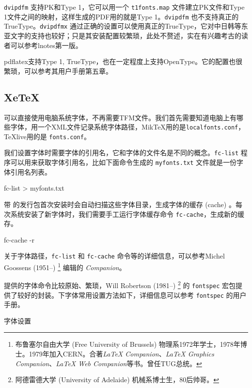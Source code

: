 \texttt{dvipdfm} 支持PK和Type 1，它可以用一个 \texttt{t1fonts.map} 文件建立PK文件和Type 1文件之间的映射，这样生成的PDF用的就是Type 1。\texttt{dvipdfm} 也不支持真正的TrueType。\texttt{dvipdfmx} 通过正确的设置可以使用真正的TrueType，它对中日韩等东亚文字的支持也较好；只是其安装配置较繁琐，此处不赘述，实在有兴趣考古的读者可以参考lnotes第一版\citep{Huang_2008}。

pdflatex支持Type 1, TrueType，也在一定程度上支持OpenType。它的配置也很繁琐，可以参考其用户手册\citep{Han_2007}第五章。

\subsection{XeTeX}

\XeTeX 可以直接使用电脑系统字体，不再需要TFM文件。我们首先需要知道电脑上有哪些字体，\XeTeX 用一个XML文件记录系统字体路径，MikTeX用的是\texttt{localfonts.conf}，TeXlive用的是 \texttt{fonts.conf}。

我们设置字体时需要字体的引用名，它和字体的文件名是不同的概念。\texttt{fc-list} 程序可以用来获取字体引用名，比如下面命令生成的 \texttt{myfonts.txt} 文件就是一份字体引用名列表。

\begin{Code}[]
fc-list > myfonts.txt
\end{Code}

带 \XeTeX 的发行包首次安装时会自动扫描这些字体目录，生成字体的缓存 (cache) 。每次系统安装了新字体时，我们需要手工运行字体缓存命令 \texttt{fc-cache}，生成新的缓存。

\begin{Code}[]
fc-cache -r
\end{Code}

关于字体路径，\texttt{fc-list} 和 \texttt{fc-cache} 命令等的详细信息，可以参考Michel Goossens (1951--)\indexGoossens{} \footnote{布鲁塞尔自由大学 (Free University of Brussels) 物理系1972年学士，1978年博士。1979年加入CERN。合著\emph{\LaTeX{} Companion}、\emph{\LaTeX{} Graphics Companion}、\emph{\LaTeX{} Web Companion}等书。曾任TUG总统。} 编辑的\emph{\XeTeX{} Companion}\citep{Goossens_2010}。

\XeTeX 提供的字体命令比较原始、繁琐，Will Robertson (1981--)\indexRobertson{} \footnote{阿德雷德大学 (University of Adelaide) 机械系博士生，80后帅哥。} 的 \texttt{fontspec} 宏包提供了较好的封装。\XeLaTeX 下字体常用设置方法如下，详细信息可以参考 \texttt{fontspec} 的用户手册\citep{Robertson_2008}。

\begin{example}[h]
\begin{Code}[]
\usepackage{fontspec}
\setmainfont[Mapping=tex-text]{Times New Roman}
\setsansfont[Mapping=tex-text]{Tahoma}
\setmonofont{Courier New}
\end{Code}
\caption{\XeLaTeX 字体设置}
\label{exa:xelatex_font}
\end{example}

